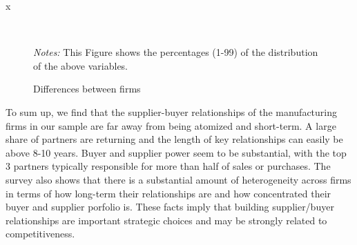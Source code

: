 x\documentclass[final, dvipsnames, authoryear,12pt]{elsarticle}
\begin{document}
\begin{figure}[!h]
    \caption{Differences between firms}
    \label{fig:happy_few}
    \begin{center}
    \\
    \end{center}    
        {\footnotesize \textit{Notes:} This Figure shows the percentages (1-99) of the distribution of the above variables.} 
\end{figure}


To sum up, we find that the supplier-buyer relationships of the manufacturing firms in our sample are far away from being atomized and short-term. A large share of partners are returning and the length of key relationships can easily be above 8-10 years. Buyer and supplier power seem to be substantial, with the top 3 partners typically responsible for more than half of sales or purchases. The survey also shows that there is a substantial amount of heterogeneity across firms in terms of how long-term their relationships are and how concentrated their buyer and supplier porfolio is. These facts imply that building supplier/buyer relationships are important strategic choices and may be strongly related to competitiveness.
\end{document}
